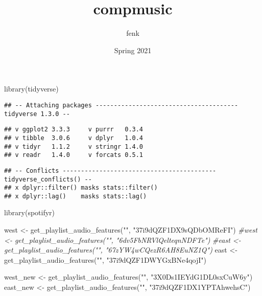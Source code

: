\documentclass[
]{article}
\title{compmusic}
\author{fenk}
\date{Spring 2021}
\newenvironment{Shaded}{\begin{snugshade}}{\end{snugshade}}
\newcommand{\CommentTok}[1]{\textcolor[rgb]{0.56,0.35,0.01}{\textit{#1}}}
\newcommand{\FunctionTok}[1]{\textcolor[rgb]{0.00,0.00,0.00}{#1}}
\newcommand{\NormalTok}[1]{#1}
\newcommand{\OtherTok}[1]{\textcolor[rgb]{0.56,0.35,0.01}{#1}}
\newcommand{\StringTok}[1]{\textcolor[rgb]{0.31,0.60,0.02}{#1}}
\begin{document}
\maketitle

\begin{Shaded}
\begin{Highlighting}[]
\FunctionTok{library}\NormalTok{(tidyverse)}
\end{Highlighting}
\end{Shaded}

\begin{verbatim}
## -- Attaching packages --------------------------------------- tidyverse 1.3.0 --
\end{verbatim}

\begin{verbatim}
## v ggplot2 3.3.3     v purrr   0.3.4
## v tibble  3.0.6     v dplyr   1.0.4
## v tidyr   1.1.2     v stringr 1.4.0
## v readr   1.4.0     v forcats 0.5.1
\end{verbatim}

\begin{verbatim}
## -- Conflicts ------------------------------------------ tidyverse_conflicts() --
## x dplyr::filter() masks stats::filter()
## x dplyr::lag()    masks stats::lag()
\end{verbatim}

\begin{Shaded}
\begin{Highlighting}[]
\FunctionTok{library}\NormalTok{(spotifyr)}
\end{Highlighting}
\end{Shaded}

\begin{Shaded}
\begin{Highlighting}[]
\NormalTok{west }\OtherTok{\textless{}{-}} \FunctionTok{get\_playlist\_audio\_features}\NormalTok{(}\StringTok{""}\NormalTok{, }\StringTok{"37i9dQZF1DX9sQDbOMReFI"}\NormalTok{)}
\CommentTok{\#west \textless{}{-} get\_playlist\_audio\_features("", "6dv5FbNRVlQelteqnNDFTe")}
\CommentTok{\#east \textless{}{-} get\_playlist\_audio\_features("", "67zYW4wCQezR6AH8EuNZ1Q")}
\NormalTok{east }\OtherTok{\textless{}{-}} \FunctionTok{get\_playlist\_audio\_features}\NormalTok{(}\StringTok{""}\NormalTok{, }\StringTok{"37i9dQZF1DWYGxBNe4qojI"}\NormalTok{)}

\NormalTok{west\_new }\OtherTok{\textless{}{-}} \FunctionTok{get\_playlist\_audio\_features}\NormalTok{(}\StringTok{""}\NormalTok{, }\StringTok{"3X0Ds1IEYdG1DL0sxCuW6y"}\NormalTok{)}
\NormalTok{east\_new }\OtherTok{\textless{}{-}} \FunctionTok{get\_playlist\_audio\_features}\NormalTok{(}\StringTok{""}\NormalTok{, }\StringTok{"37i9dQZF1DX1YPTAhwehsC"}\NormalTok{)}
\end{Highlighting}
\end{Shaded}
\end{document}
